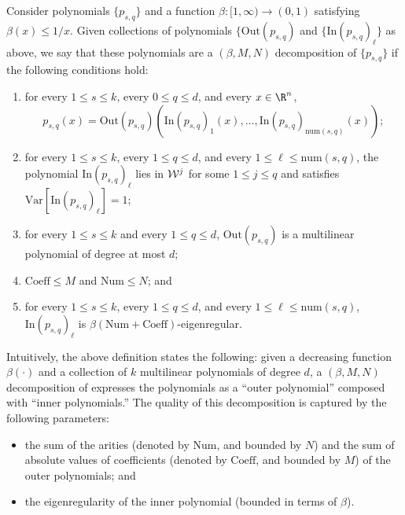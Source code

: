 \documentclass{toc}
\newcommand{\Inner}{\mathrm{In}}
\newcommand{\Outer}{\mathrm{Out}}
\newcommand{\num}{\mathrm{num}}
\newcommand{\Var}{\mathrm{Var}}
\begin{document}
\begin{definition}
    Consider polynomials $\{p_{s,q}\}$ and a function $\beta: [1, \infty) \to (0, 1)$ satisfying $\beta(x) \le 1/x$.
    Given collections of polynomials $\{\Outer(p_{s,q})$ and $\{\Inner(p_{s,q})_\ell\}$ as above, we say that
        these polynomials are a $(\beta, M, N)$ decomposition of $\{p_{s,q}\}$ if the following conditions hold:

\begin{enumerate}
    \item for every $1 \le s \le k$, every $0 \le q \le d$, and every $x \in \R^n$,
    \begin{equation} \label{eq:tildep}
        p_{s,q}(x)=
        \Outer(p_{s,q})\left(
        \Inner(p_{s,q})_1(x),\dots, \Inner(p_{s,q})_{\num({s,q})}(x)\right);
    \end{equation}
    \item for every $1 \le s \le k$, every $1 \leq q \leq d$, and every $1 \le \ell \le \num(s,q)$,
        the polynomial $\Inner(p_{s,q})_\ell$ lies in ${\cal W}^j$ for some $1 \leq j \leq q$ and
        satisfies $\Var[\Inner(p_{s,q})_\ell] = 1$;

    \item for every $1 \le s \le k$ and every $1 \leq q \leq d$,
    $\Outer(p_{s,q})$ is a multilinear polynomial of degree at most $d$;

    \item $\mathrm{Coeff} \le M$ and $\mathrm{Num} \le N$; and

    \item for every $1 \le s \le k$, every $1 \leq q \leq d$, and every $1 \le \ell \le \num(s,q)$,
        $\Inner(p_{s,q})_\ell$ is $\beta(\mathrm{Num} + \mathrm{Coeff})$-eigenregular.
\end{enumerate}
\end{definition}

Intuitively, the above definition states the following: given a decreasing
function $\beta(\cdot)$ and a collection of $k$ multilinear polynomials of degree
$d$, a $(\beta, M,N)$ decomposition of expresses the polynomials as a ``outer
polynomial'' composed with ``inner polynomials.'' The quality of this
decomposition is captured by the following parameters: 
\begin{itemize}
\item the sum of the arities (denoted by $\mathrm{Num}$, and bounded by $N$) and the sum of
    absolute values of coefficients (denoted by $\mathrm{Coeff}$, and bounded by $M$) of the outer
    polynomials; and
\item the eigenregularity of the inner polynomial (bounded in terms of $\beta$).
\end{itemize}
\end{document}
